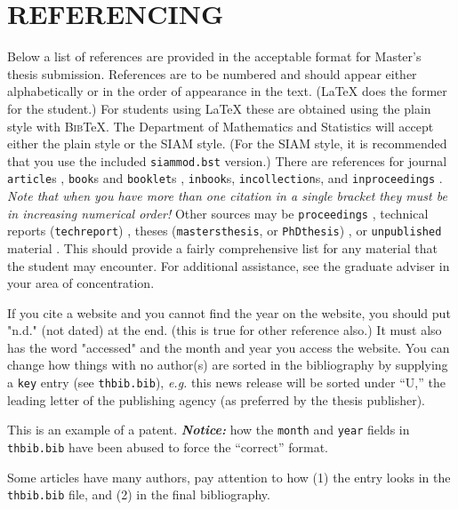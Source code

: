 \chapter{REFERENCING}

Below a list of references are provided in the acceptable format for
Master's thesis submission. References are to be numbered and should
appear either alphabetically or in the order of appearance in the
text.  (\LaTeX{} does the former for the student.) For students using
\LaTeX{} these are obtained using the plain style with
\textsc{Bib}\TeX. The Department of Mathematics and Statistics will
accept either the plain style or the SIAM style. (For the SIAM style,
it is recommended that you use the included \texttt{siammod.bst}
version.)  There are references for journal \texttt{article}s
\cite{ART}, \texttt{book}s and \texttt{booklet}s \cite{BOK,BKL},
\texttt{inbook}s, \texttt{incollection}s, and \texttt{inproceedings}
\cite{INC,INB,INP}. \emph{Note that when you have more than one citation in a single
  bracket they must be in increasing numerical order!}  Other sources
may be \texttt{proceedings} \cite{PRO}, technical reports
(\texttt{techreport}) \cite{TEC}, theses (\texttt{mastersthesis}, or
\texttt{PhDthesis}) \cite{MTH}, or \texttt{unpublished} material
\cite{UNP}.  This should provide a fairly comprehensive list for any
material that the student may encounter.  For additional assistance,
see the graduate adviser in your area of concentration.

If you cite a website \cite{Wikipedia} and you cannot find the year on
the website, you should put "n.d." (not dated) at the end. (this is
true for other reference also.) It must also has the word "accessed"
and the month and year you access the website.  You can change how
things with no author(s) are sorted in the bibliography by supplying a
\texttt{key} entry (see \texttt{thbib.bib}), \emph{e.g.} this news
release \cite{EPA-2010-09-07} will be sorted under ``U,'' the leading
letter of the publishing agency (as preferred by the thesis
publisher).

This \cite{PatentExample} is an example of a patent.
\textbf{\textit{Notice:}} how the \texttt{month} and \texttt{year}
fields in \texttt{thbib.bib} have been abused to force the ``correct''
format.

Some articles \cite{ABCD2019} have many authors, pay attention to how
(1) the entry looks in the \texttt{thbib.bib} file, and (2) in the
final bibliography.


